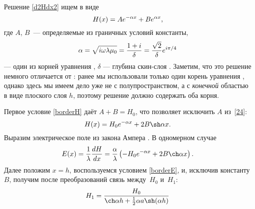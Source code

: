 Решение \eqref{d2Hdx2} ищем в виде
\begin{equation} \eqmark{24}
H(x)=A e^{-\alpha x}+ B e^{\alpha x},
\end{equation}
где $A$, $B$~--- определяемые из граничных условий константы,
\begin{equation}\eqmark{alpha}
\alpha=\sqrt{i\omega \lambda \mu_0}=\frac{1+i}{\delta} =
\frac{\sqrt{2}}{\delta} e^{i\pi/4}
\end{equation} --- один из корней уравнения ,
$\delta$ --- глубина скин-слоя .
Заметим, что это решение немного отличается от : ранее мы использовали только
один корень уравнения , однако здесь мы имеем дело уже не с
полупространством, а с \emph{конечной} областью в виде плоского слоя $h$,
поэтому решение должно содержать оба корня.

Первое условие \eqref{borderH} даёт $A+B = H_0$, что
позволяет исключить $A$ из~\eqref{24}:
\[
H(x) = H_0 e^{-\alpha x} + 2B \sh \alpha x.
\]
Выразим электрическое поле из закона Ампера .
В одномерном случае
\[
E(x) = \frac{1}{\lambda} \frac{dH}{dx} =
\frac{\alpha}{\lambda}\left(-H_0 e^{-\alpha x}+ 2B \ch \alpha x\right).
\]
Далее положим $x=h$, воспользуемся условием \eqref{borderE},
и, исключив константу $B$, получим после преобразований связь
между~$H_0$ и~$H_1$:
\begin{equation}\eqmark{H0H1}
H_1 = \frac{H_0}{\ch \alpha h + \frac12 \alpha a \sh (\alpha h)}
\end{equation}

